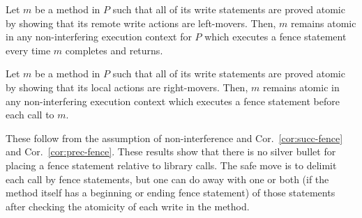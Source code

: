 \begin{theorem}\label{thm:after-fence}
Let $m$ be a method in $P$ such that all of its write statements are proved atomic by showing that its remote write actions are left-movers.
Then, $m$ remains atomic in any non-interfering execution context for $P$ which executes a fence statement every time $m$ completes and returns.
\end{theorem}
\begin{theorem}\label{thm:before-fence}
Let $m$ be a method in $P$ such that all of its write statements are proved atomic by showing that its local actions are right-movers.
Then, $m$ remains atomic in any non-interfering execution context which executes a fence statement before each call to $m$.
\end{theorem}
These follow from the assumption of non-interference and Cor.~\ref{cor:succ-fence} and Cor.~\ref{cor:prec-fence}.
These results show that there is no silver bullet for placing a fence statement relative to library calls. 
The safe move is to delimit each call by fence statements, but one can do away with one or both (if the method itself has a beginning or ending fence statement) of those statements after checking the atomicity of each write in the method.

